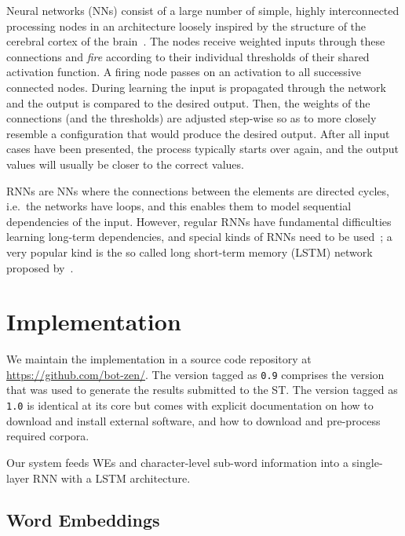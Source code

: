 \documentclass[11pt]{article}
\begin{document}
Neural networks (NNs) consist of a large number of simple, highly interconnected
processing nodes in an architecture loosely inspired by the structure of the
cerebral cortex of the brain~\cite{oreilly2000}.
The nodes receive weighted inputs through these connections and \emph{fire}
according to their individual thresholds of their shared activation function.
A firing node passes on an activation to all successive connected nodes.
During learning the input is propagated through the network and the output is
compared to the desired output. 
Then, the weights of the connections (and the thresholds) are adjusted
step-wise so as to more closely resemble a configuration that would produce the
desired output.
After all input cases have been presented, the process typically starts over
again, and the output values will usually be closer to the correct values.

RNNs are NNs where the connections between the elements are directed cycles,
i.e.~the networks have loops, and this enables them to model sequential
dependencies of the input.
However, regular RNNs have fundamental difficulties learning long-term
dependencies, and special kinds of RNNs need to be used~\cite{Hochreiter1991}; 
a very popular kind is the so called long short-term memory (LSTM)
network proposed by~.


\section{Implementation} %
\label{sec:implementation}

We maintain the implementation in a source code repository at
\url{https://github.com/bot-zen/}.  
The version tagged as {\tt 0.9} comprises the version that was used to generate
the results submitted to the ST.
The version tagged as {\tt 1.0} is identical at its core but comes with
explicit documentation on how to download and install external software, and
how to download and pre-process required corpora.

Our system feeds WEs and character-level sub-word information into a
single-layer RNN with a LSTM architecture.


\subsection{Word Embeddings} %
\end{document}
